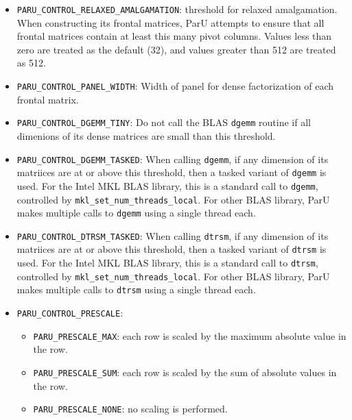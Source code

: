 \documentclass[12pt]{article}
\begin{document}
\begin{itemize}
    \item \verb'PARU_CONTROL_RELAXED_AMALGAMATION': %
        threshold for relaxed amalgamation. When constructing its frontal
        matrices, ParU attempts to ensure that all frontal matrices contain at
        least this many pivot columns.  Values less than zero are treated as
        the default (32), and values greater than 512 are treated as 512.

    \item \verb'PARU_CONTROL_PANEL_WIDTH': %
        Width of panel for dense factorization of
        each frontal matrix.

    \item \verb'PARU_CONTROL_DGEMM_TINY': %
        Do not call the BLAS \verb'dgemm' routine if all dimenions of its dense
        matrices are small than this threshold.

    \item \verb'PARU_CONTROL_DGEMM_TASKED': %
        When calling \verb'dgemm', if any dimension of its matriices are at or
        above this threshold, then a tasked variant of \verb'dgemm' is used.
        For the Intel MKL BLAS library, this is a standard call to
        \verb'dgemm', controlled by \verb'mkl_set_num_threads_local'.  For
        other BLAS library, ParU makes multiple calls to \verb'dgemm' using a
        single thread each.

    \item \verb'PARU_CONTROL_DTRSM_TASKED': %
        When calling \verb'dtrsm', if any dimension of its matriices are at or
        above this threshold, then a tasked variant of \verb'dtrsm' is used.
        For the Intel MKL BLAS library, this is a standard call to
        \verb'dtrsm', controlled by \verb'mkl_set_num_threads_local'.  For
        other BLAS library, ParU makes multiple calls to \verb'dtrsm' using a
        single thread each.

    \item \verb'PARU_CONTROL_PRESCALE': %

        \begin{itemize}
        \item \verb'PARU_PRESCALE_MAX':  each row is scaled by
        the maximum absolute value in the row.
        \item \verb'PARU_PRESCALE_SUM':  each row is scaled by
        the sum of absolute values in the row.
        \item \verb'PARU_PRESCALE_NONE': no scaling is performed.
        \end{itemize}


\end{itemize}
\end{document}
